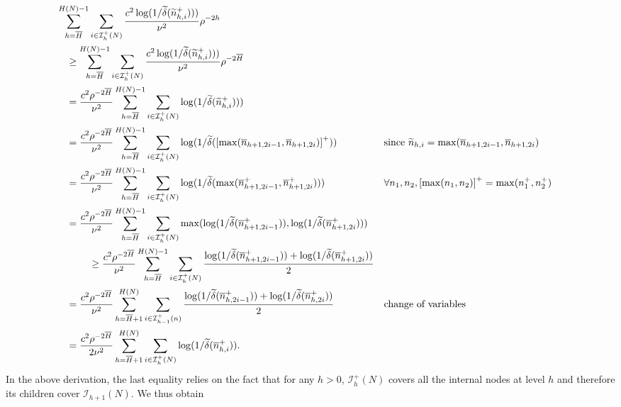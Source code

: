       \begin{align*}
       \sum_{h=\bar{H}}^{H(N)-1}&\sum_{i\in\mathcal{I}_h^+(N)} \frac{c^2\log(1/\tilde{\delta}(\tilde{n}_{h,i}^+)))}{\nu^2}\rho^{-2h}  \\
       & \hspace{-0.8cm}  \geq \sum_{h=\bar{H}}^{H(N)-1}\sum_{i\in\mathcal{I}_h^+(N)} \frac{c^2\log(1/\tilde{\delta}(\tilde{n}_{h,i}^+)))}{\nu^2}\rho^{-2\bar{H}} \\
      & \hspace{-0.8cm}= \frac{c^2\rho^{-2\bar{H}}}{\nu^2} \sum_{h=\bar{H}}^{H(N)-1}\sum_{i\in\mathcal{I}_h^+(N)} \log(1/\tilde{\delta}(\tilde{n}_{h,i}^+))) \\
      & \hspace{-0.8cm}= \frac{c^2\rho^{-2\bar{H}}}{\nu^2} \sum_{h=\bar{H}}^{H(N)-1}\sum_{i\in\mathcal{I}_h^+(N)} \log(1/\tilde{\delta}(\left[\max(\bar{n}_{h+1,2i-1},\bar{n}_{h+1,2i})\right]^+)) && \text{since $\tilde{n}_{h,i}=\max(\bar{n}_{h+1,2i-1},\bar{n}_{h+1,2i})$} \\
      & \hspace{-0.8cm}= \frac{c^2\rho^{-2\bar{H}}}{\nu^2} \sum_{h=\bar{H}}^{H(N)-1}\sum_{i\in\mathcal{I}_h^+(N)} \log(1/\tilde{\delta}(\max(\bar{n}_{h+1,2i-1}^+,\bar{n}_{h+1,2i}^+))) && \text{$\forall n_1,n_2,\left[\max(n_1,n_2)\right]^+=\max(n_1^+,n_2^+)$} \\
      & \hspace{-0.8cm}= \frac{c^2\rho^{-2\bar{H}}}{\nu^2} \sum_{h=\bar{H}}^{H(N)-1}\sum_{i\in\mathcal{I}_h^+(N)} \max(\log(1/\tilde{\delta}(\bar{n}_{h+1,2i-1}^+)),\log(1/\tilde{\delta}(\bar{n}_{h+1,2i}^+))) \\
      & \geq \frac{c^2\rho^{-2\bar{H}}}{\nu^2} \sum_{h=\bar{H}}^{H(N)-1}\sum_{i\in\mathcal{I}_h^+(N)} \frac{\log(1/\tilde{\delta}(\bar{n}_{h+1,2i-1}^+))+\log(1/\tilde{\delta}(\bar{n}_{h+1,2i}^+))}{2} \\
      &\hspace{-0.8cm} = \frac{c^2\rho^{-2\bar{H}}}{\nu^2} \sum_{h=\bar{H}+1}^{H(N)}\sum_{i\in\mathcal{I}_{h-1}^+(n)} \frac{\log(1/\tilde{\delta}(\bar{n}_{h,2i-1}^+))+\log(1/\tilde{\delta}(\bar{n}_{h,2i}^+))}{2} && \text{change of variables} \\
      &\hspace{-0.8cm} = \frac{c^2\rho^{-2\bar{H}}}{2\nu^2} \sum_{h=\bar{H}+1}^{H(N)}\sum_{i\in\mathcal{I}_h^+(N)} \log(1/\tilde{\delta}(\bar{n}_{h,i}^+)).
\end{align*}
In the above derivation, the last equality relies on the fact that for any $h>0$, $\mathcal{I}_h^+(N)$ covers all the internal nodes at level $h$ and therefore its children cover $\mathcal{I}_{h+1}(N)$. We  thus obtain

